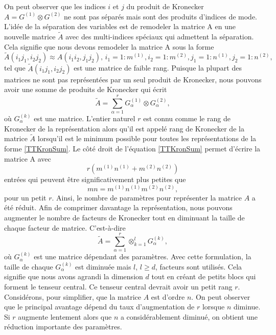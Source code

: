 \documentclass[11pt,a4paper,oneside]{book}
\begin{document}
On peut observer que les indices $ i $ et $ j $ du produit de Kronecker $A = G^{(1)}\otimes G^{(2)}$ ne sont pas séparés mais sont des produits d'indices de mode. L'idée de la séparation des variables est de remodeler la matrice A en une nouvelle matrice $\tilde{A}$ avec des multi-indices spéciaux qui admettent la séparation. Cela signifie que nous devons remodeler la matrice A sous la forme
\begin{equation}
\tilde{A}(i_1j_1,i_2j_2)\approx A(i_1i_2,j_1j_2),\, i_1 = 1:m^{(1)},i_2 = 1:m^{(2)},j_1 = 1:n^{(1)},j_2 = 1:n^{(2)},
\end{equation}
tel que $\tilde{A}(i_1j_1,i_2j_2)$ est une matrice de faible rang. Puisque la plupart des matrices ne sont pas représentées par un seul produit de Kronecker, nous pouvons avoir une somme de produits de Kronecker qui écrit
\begin{equation}
\label{TTKronSum}
\tilde{A} = \sum_{\alpha = 1}^rG_{\alpha}^{(1)} \otimes G_{\alpha}^{(2)},
\end{equation}
où $G_{\alpha}^{(k)} $ est une matrice. L'entier naturel $ r $ est connu comme le rang de Kronecker de la représentation alors qu'il est appelé rang de Kronecker de la matrice $\tilde{A}$ lorsqu'il est le minimum possible pour toutes les représentations de la forme \eqref{TTKronSum}. Le côté droit de l'équation \eqref{TTKronSum} permet d'écrire la matrice A avec
 $$r(m^{(1)}n^{(1)}+m^{(2)}n^{(2)})$$
 entrées qui peuvent être significativement plus petites que $$mn = m^{(1)}n^{(1)}m^{(2)}n^{(2)},$$
 pour un petit $ r $. Ainsi, le nombre de paramètres pour représenter la matrice $ A $ a été réduit. Afin de comprimer davantage la représentation, nous pouvons augmenter le nombre de facteurs de Kronecker tout en diminuant la taille de chaque facteur de matrice. C'est-à-dire
\begin{equation}
\label{TTKronSum2}
\tilde{A} = \sum_{\alpha = 1}^r \otimes_{k = 1}^l G_{\alpha}^{(k)},
\end{equation}
où $G_{\alpha}^{(k)}$ est une matrice dépendant des paramètres. Avec cette formulation, la taille de chaque $G_{\alpha}^{(k)}$ est diminuée mais $ l $,  $ l\geq d $, facteurs sont utilisés. Cela signifie que nous avons agrandi la dimension $ d $ tout en créant de petits blocs qui forment le tenseur central. Ce tenseur central devrait avoir un petit rang $ r $. Considérons, pour simplifier, que la matrice $ A $ est d'ordre $ n $. On peut observer que le principal avantage dépend du taux d'augmentation de $ r $ lorsque $ n $ diminue. Si $ r $ augmente lentement alors que $ n $ a considérablement diminué, on obtient une réduction importante des paramètres.
\end{document}
